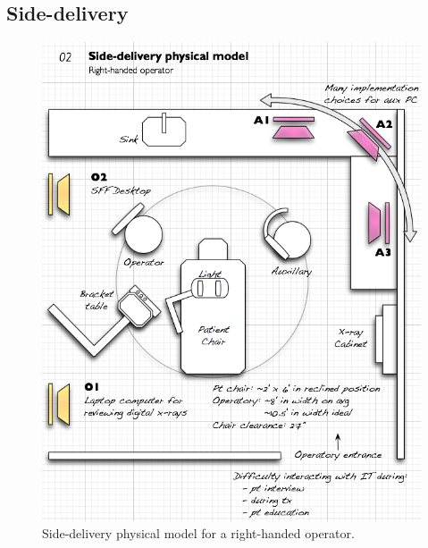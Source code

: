 \documentclass[11pt]{article}
\begin{document}
\subsection{Side-delivery}
\begin{figure}[h!]
\begin{center}
\includegraphics[width=\textwidth]{phymodel2.png}
\end{center}
\caption{Side-delivery physical model for a right-handed operator.}
\end{figure}

\newpage
\end{document}
